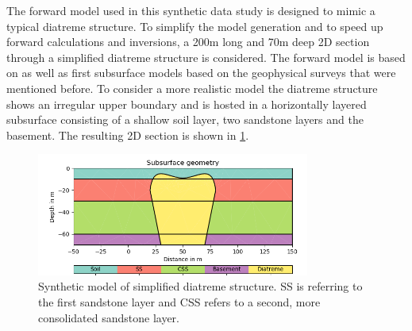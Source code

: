 The forward model used in this synthetic data study is designed to mimic a typical diatreme structure. To simplify the model generation and to speed up forward calculations and inversions, a 200m long and 70m deep 2D section through a simplified diatreme structure is considered. The forward model is based on \citet{white2011maar} as well as first subsurface models based on the geophysical surveys that were mentioned before. To consider a more realistic model the diatreme structure shows an irregular upper boundary and is hosted in a horizontally layered subsurface consisting of a shallow soil layer, two sandstone layers and the basement. The resulting 2D section is shown in \ref{figure:synthetic_model}.

\begin{figure}[]
  \centering
    \includegraphics[width=0.8\textwidth]{Figures/Model.png}
    \caption[Synthetic model of simplified diatreme structure]{Synthetic model of simplified diatreme structure. SS is referring to the first sandstone layer and CSS refers to a second, more consolidated sandstone layer.}
    \label{figure:synthetic_model}
\end{figure}